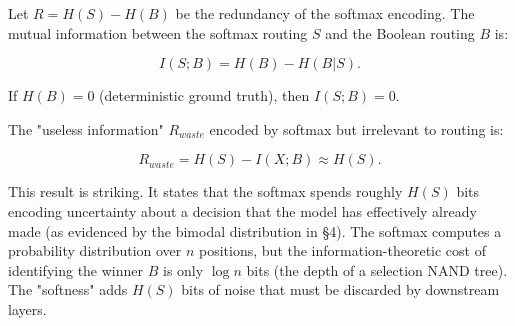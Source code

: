 \begin{theorem}






\label{thm:redundancy}






Let $R = H(S) - H(B)$ be the redundancy of the softmax encoding. The mutual information between the softmax routing $S$ and the Boolean routing $B$ is:






\[






I(S; B) = H(B) - H(B|S).






\]






If $H(B) = 0$ (deterministic ground truth), then $I(S; B) = 0$.






The "useless information" $R_{waste}$ encoded by softmax but irrelevant to routing is:






\[






R_{waste} = H(S) - I(X; B) \approx H(S).






\]






\end{theorem}













This result is striking. It states that the softmax spends roughly $H(S)$ bits encoding uncertainty about a decision that the model has effectively already made (as evidenced by the bimodal distribution in \S4). The softmax computes a probability distribution over $n$ positions, but the information-theoretic cost of identifying the winner $B$ is only $\log n$ bits (the depth of a selection NAND tree). The "softness" adds $H(S)$ bits of noise that must be discarded by downstream layers.














